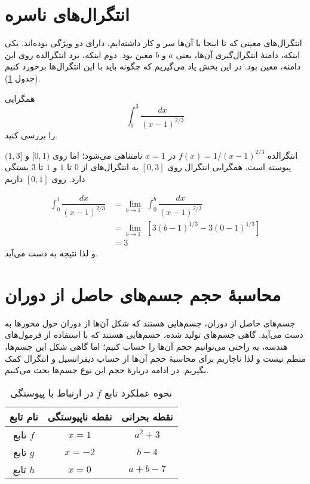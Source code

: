 \section{انتگرال‌های ناسره}
انتگرال‌های معینی که تا اینجا با آن‌ها سر و کار داشته‌ایم، دارای دو ویژگی بوده‌اند.%
\cite{aliprantis}
یکی اینکه، دامنهٔ انتگرال‌گیری آن‌ها، یعنی $a$ و $b$ معین بود. دوم اینکه، برد
انتگرالده روی این دامنه، معین بود. در این بخش یاد 
می‌گیریم که چگونه باید با این انتگرال‌ها برخورد کنیم  (جدول \ref{tab1-1}).
\begin{example}
همگرایی 
\[
\int_{0}^{3}\dfrac{dx}{(x-1)^{2/3}}
\]
را بررسی کنید.
\end{example}

\begin{solution}
انتگرالده $f(x)=1/(x-1)^{2/3}$ در $x=1$ نامتناهی می‌شود؛  اما 
روی $[0,1)$ و $(1,3]$ پیوسته است.
همگرایی انتگرال روی $[0,3]$ به انتگرال‌های از $0$ تا $1$ و $1$ تا $3$ بستگی
دارد. روی $[0,1]$ داریم

\begin{align*}
\int_{0}^{1}\dfrac{dx}{(x-1)^{2/3}}&=
	\lim_{b\rightarrow 1^{-}}\int_{0}^{b}\dfrac{dx}{(x-1)^{2/3}}\\[3mm]
	&=\lim_{b\rightarrow 1^{-}}[3(b-1)^{1/3}-3(0-1)^{1/3}]\\
	&=3
\end{align*}
و لذا نتیجه به دست می‌آید.
\end{solution}

\section{محاسبهٔ حجم جسم‌های حاصل از دوران}
جسم‌های حاصل از دوران، جسم‌هایی هستند که شکل آن‌ها از دوران حول محور‌ها به دست می‌آید. گاهی جسم‌های تولید شده، جسم‌هایی هستند که با استفاده از فرمول‌های هندسه، به راحتی می‌توانیم حجم آن‌ها را حساب کنیم؛ اما گاهی شکل این جسم‌ها، منظم نیست و لذا ناچاریم برای محاسبهٔ حجم آن‌ها از حساب دیفرانسیل و انتگرال کمک بگیریم. 
در ادامه دربارهٔ حجم این نوع جسم‌ها بحث می‌کنیم.

\begin{table}[!t]
\centering
\caption{
نحوه عملکرد تابع $f$ در ارتباط با پیوستگی
}
\begin{tabular}{ccc}
\toprule
نام تابع & نقطه ناپیوستگی & نقطه بحرانی
\\
\midrule
تابع $f$ & 
$x=1$ & $a^2+3$\\
تابع $g$ & 
$x=-2$ & $b-4$\\
تابع $h$ & 
$x=0$ & $a+b-7$
\\ \bottomrule
\end{tabular}
\label{tab1-1}
\end{table}
